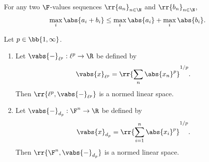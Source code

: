 \documentclass{article}
\begin{document}
\begin{theorem}
  \label{thm:minkowski-for-p-infinite}
  For any two $\F$-values sequences $ \rr{a_n}_{n\in\N}$ and $ \rr{b_n}_{n\in\N}$,
  \begin{align*}
    \max_i \abs{ a_i + b_i } \leq \max_i \abs{ a_i } + \max_i \abs{ b_i }.
  \end{align*}
\end{theorem}

\begin{theorem}
  \label{thm:dl-norms}
  Let $p\in \bb{ 1,\infty }$.
  \begin{enumerate}
    \item Let $ \vabs{ - }_{ \ell^p } : \ell^p \to \R$ be defined by \begin{align*}
        \vabs{ x }_{ \ell^p } = \rr{ \sum_{ n }^{  } \abs{ x_n }^p }^{1/p}.
      \end{align*}
      Then $ \rr{ \ell^p, \vabs{ - }_{ \ell^p } }$ is a normed linear space.
    \item Let $ \vabs{ - }_{ d_p } : \F^n \to \R$ be defined by \begin{align*}
        \vabs{ x }_{ d_p } = \rr{ \sum_{ i=1 }^{ n } \abs{ x_i }^p }^{1/p}.
      \end{align*}
      Then $ \rr{ \F^n, \vabs{ - }_{ d_p } } $ is a normed linear space.
  \end{enumerate}
\end{theorem}
\end{document}
